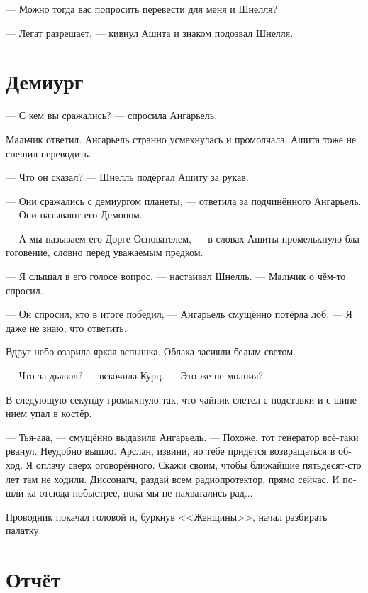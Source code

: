 \documentclass[a4paper,12pt,fleqn]{book}\usepackage{polyglossia}\setdefaultlanguage[babelshorthands=true]{russian}\setotherlanguage{english}\defaultfontfeatures{Ligatures=TeX,Mapping=tex-text}\usepackage{xcolor}\newcommand{\ml}[3]{#2}
\begin{document}
--- Можно тогда вас попросить перевести для меня и Шнелля?

--- Легат разрешает, --- кивнул Ашита и знаком подозвал Шнелля.

\section{Демиург}

--- С кем вы сражались? --- спросила Ангарьель.

Мальчик ответил.
Ангарьель странно усмехнулась и промолчала.
Ашита тоже не спешил переводить.

--- Что он сказал? --- Шнелль подёргал Ашиту за рукав.

--- Они сражались с демиургом планеты, --- ответила за подчинённого Ангарьель.
--- Они называют его Демоном.

--- А мы называем его Дорге Основателем, --- в словах Ашиты промелькнуло благоговение, словно перед уважаемым предком.

--- Я слышал в его голосе вопрос, --- настаивал Шнелль.
--- Мальчик о чём-то спросил.

--- Он спросил, кто в итоге победил, --- Ангарьель смущённо потёрла лоб.
--- Я даже не знаю, что ответить.

Вдруг небо озарила яркая вспышка.
Облака засияли белым светом.

--- Что за дьявол? --- вскочила Курц.
--- Это же не молния?

В следующую секунду громыхнуло так, что чайник слетел с подставки и с шипением упал в костёр.

--- Тья-ааа, --- смущённо выдавила Ангарьель.
\ml{$0$}
{--- Похоже, тот генератор всё-таки рванул.}
{``It sounds like that powerhouse has after all exploded.}
\ml{$0$}
{Неудобно вышло.}
{That's awkward.}
Арслан, извини, но тебе придётся возвращаться в обход.
Я оплачу сверх оговорённого.
\ml{$0$}
{Скажи своим, чтобы ближайшие пятьдесят-сто лет там не ходили.}
{Tell your people to keep the distance from that place, for fifteen or hundred years or so.}
Диссонатч, раздай всем радиопротектор, прямо сейчас.
И пошли-ка отсюда побыстрее, пока мы не нахватались рад...

Проводник покачал головой и, буркнув <<Женщины>>, начал разбирать палатку.

\section{Отчёт}
\end{document}

